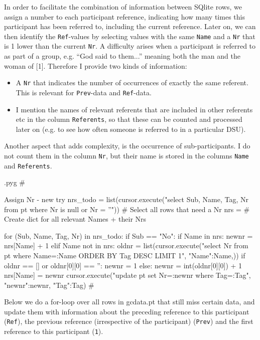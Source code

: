 \documentclass{report}
\makeatletter
\newcommand{\mi}[1]{\lstinline{#1}}
\newenvironment{python}{%
  \VerbatimEnvironment
  \minted@resetoptions
  \setkeys{minted@opt}{}
      \begin{VerbatimOut}{\jobname.pyg}}
{%
      \end{VerbatimOut}
      \minted@pygmentize{python}
      \DeleteFile{\jobname.pyg}}
\makeatother
\begin{document}
In order to facilitate the combination of information between SQlite rows,
we assign a number to each participant reference, indicating how many times
this participant has been referred to, including the current reference.
Later on, we can then identify the \mi{Ref}-values by selecting values with the
same \mi{Name} and a \mi{Nr} that is 1 lower than the current \mi{Nr}.
A difficulty arises when a participant is referred to as part of a group,
e.g. ``God said to them...'' meaning both the man and the woman of [1].
Therefore I provide two kinds of information:
\begin{itemize}
\item A \mi{Nr} that indicates the number of occurrences of exactly the same referent. This is relevant for \mi{Prev}-data and \mi{Ref}-data.
\item I mention the names of relevant referents that are included in other referents etc in the column \mi{Referents}, so that these can be counted and processed later on (e.g. to see how often someone is referred to in a particular DSU).
\end{itemize}
Another aspect that adds complexity, is the occurrence of sub-participants.
I do not count them in the column \mi{Nr}, but their name is stored in the columns
\mi{Name} and \mi{Referents}.


\begin{python}
#{{{ Assign Nr - new try
nrs_todo = list(cursor.execute("select Sub, Name, Tag, Nr from pt where Nr is null or Nr = ''"))  # Select all rows that need a Nr
nrs = {}    # Create dict for all relevant Names + their Nrs

for (Sub, Name, Tag, Nr) in nrs_todo:
    if Sub == "No":
        if Name in nrs:
            newnr = nrs[Name] + 1
        elif Name not in nrs:
            oldnr = list(cursor.execute("select Nr from pt where Name=:Name ORDER BY Tag DESC LIMIT 1", {"Name":Name,}))
            if oldnr == [] or oldnr[0][0] == '':
                newnr = 1
            else:
                newnr = int(oldnr[0][0]) + 1
        nrs[Name] = newnr
        cursor.execute("update pt set Nr=:newnr where Tag=:Tag", {"newnr":newnr, "Tag":Tag})
#}}}
\end{python}

Below we do a for-loop over all rows in gcdata.pt that still miss certain data,
and update them with information about the preceding reference to this participant (\mi{Ref}),
the previous reference (irrespective of the participant) (\mi{Prev}) and the first reference
to this participant (\mi{1}).
\end{document}
